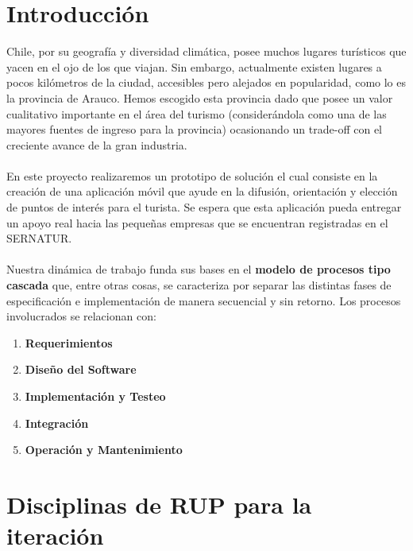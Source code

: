 \documentclass[12pt]{article}
\begin{document}
\section{Introducción}
Chile, por su geografía y diversidad climática, posee muchos lugares turísticos que yacen en el ojo de los que viajan. Sin embargo, actualmente existen lugares a pocos kilómetros de la ciudad, accesibles pero alejados en popularidad, como lo es la provincia de Arauco. Hemos escogido esta provincia dado que posee un valor cualitativo importante en el área del turismo (considerándola como una de las mayores fuentes de ingreso para la provincia) ocasionando un trade-off con el creciente avance de la gran industria.\\\\En este proyecto realizaremos un prototipo de solución el cual consiste en la creación de una aplicación móvil que ayude en la difusión, orientación y elección de puntos de interés para el turista. Se espera que esta aplicación pueda entregar un apoyo real hacia las pequeñas empresas que se encuentran registradas en el SERNATUR.\\\\Nuestra dinámica de trabajo funda sus bases en el \textbf{modelo de procesos tipo cascada} que, entre otras cosas, se caracteriza por separar las distintas fases de especificación e implementación de manera secuencial y sin retorno. Los procesos involucrados se relacionan con:
\begin{enumerate}
\item \textbf{Requerimientos}
\item \textbf{Diseño del Software} 
\item \textbf{Implementación y Testeo}
\item \textbf{Integración}
\item \textbf{Operación y Mantenimiento} 
\end{enumerate}  
\newpage
\section{Disciplinas de RUP para la iteración}
\end{document}
